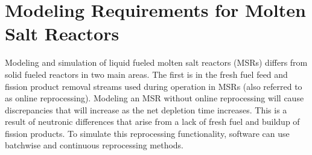 
\section{Modeling Requirements for Molten Salt Reactors}

Modeling and simulation of liquid fueled molten salt reactors (MSRs) differs from solid fueled reactors in two main areas. The first is in the fresh fuel feed and fission product removal streams used during operation in MSRs (also referred to as online reprocessing). Modeling an MSR without online reprocessing will cause discrepancies that will increase as the net depletion time increases.
This is a result of neutronic differences that arise from a lack of fresh fuel and buildup of fission products. To simulate this reprocessing functionality, software can use batchwise and continuous reprocessing methods.


